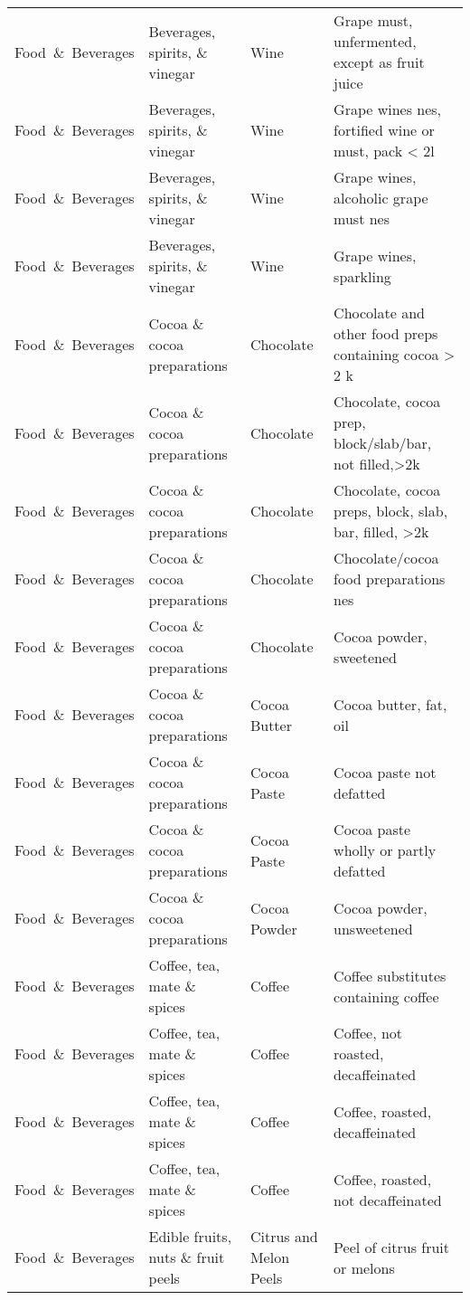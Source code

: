 \begin{appendices}
\begin{xltabular}{\textwidth}{|p{0.10\textwidth}|p{0.30\textwidth}|p{0.20\textwidth}|p{0.30\textwidth}|}
		Food\ \&\ Beverages & Beverages, spirits, \& vinegar & Wine & Grape must, unfermented, except as fruit juice \\
		Food\ \&\ Beverages & Beverages, spirits, \& vinegar & Wine & Grape wines nes, fortified wine or must, pack < 2l \\
		Food\ \&\ Beverages & Beverages, spirits, \& vinegar & Wine & Grape wines, alcoholic grape must nes \\
		Food\ \&\ Beverages & Beverages, spirits, \& vinegar & Wine & Grape wines, sparkling \\
		Food\ \&\ Beverages & Cocoa \& cocoa preparations & Chocolate & Chocolate and other food preps containing cocoa > 2 k \\
		Food\ \&\ Beverages & Cocoa \& cocoa preparations & Chocolate & Chocolate, cocoa prep, block/slab/bar, not filled,>2k \\
		Food\ \&\ Beverages & Cocoa \& cocoa preparations & Chocolate & Chocolate, cocoa preps, block, slab, bar, filled, >2k \\
		Food\ \&\ Beverages & Cocoa \& cocoa preparations & Chocolate & Chocolate/cocoa food preparations nes \\
		Food\ \&\ Beverages & Cocoa \& cocoa preparations & Chocolate & Cocoa powder, sweetened \\
		Food\ \&\ Beverages & Cocoa \& cocoa preparations & Cocoa Butter & Cocoa butter, fat, oil \\
		Food\ \&\ Beverages & Cocoa \& cocoa preparations & Cocoa Paste & Cocoa paste not defatted \\
		Food\ \&\ Beverages & Cocoa \& cocoa preparations & Cocoa Paste & Cocoa paste wholly or partly defatted \\
		Food\ \&\ Beverages & Cocoa \& cocoa preparations & Cocoa Powder & Cocoa powder, unsweetened \\
		Food\ \&\ Beverages & Coffee, tea, mate \& spices & Coffee & Coffee substitutes containing coffee \\
		Food\ \&\ Beverages & Coffee, tea, mate \& spices & Coffee & Coffee, not roasted, decaffeinated \\
		Food\ \&\ Beverages & Coffee, tea, mate \& spices & Coffee & Coffee, roasted, decaffeinated \\
		Food\ \&\ Beverages & Coffee, tea, mate \& spices & Coffee & Coffee, roasted, not decaffeinated \\
		Food\ \&\ Beverages & Edible fruits, nuts \& fruit peels & Citrus and Melon Peels & Peel of citrus fruit or melons \\

\end{xltabular}
\end{appendices}
